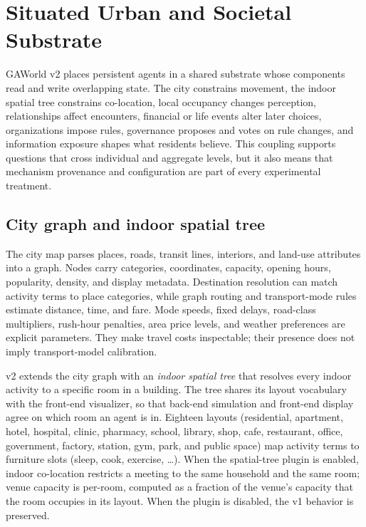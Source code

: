 \section{Situated Urban and Societal Substrate}
\label{sec:substrate}

GAWorld v2 places persistent agents in a shared substrate whose components
read and write overlapping state.  The city constrains movement, the indoor
spatial tree constrains co-location, local occupancy changes perception,
relationships affect encounters, financial or life events alter later
choices, organizations impose rules, governance proposes and votes on rule
changes, and information exposure shapes what residents believe.  This
coupling supports questions that cross individual and aggregate levels, but
it also means that mechanism provenance and configuration are part of every
experimental treatment.

\subsection{City graph and indoor spatial tree}

The city map parses places, roads, transit lines, interiors, and land-use
attributes into a graph.  Nodes carry categories, coordinates, capacity,
opening hours, popularity, density, and display metadata.  Destination
resolution can match activity terms to place categories, while graph routing
and transport-mode rules estimate distance, time, and fare.  Mode speeds,
fixed delays, road-class multipliers, rush-hour penalties, area price levels,
and weather preferences are explicit parameters.  They make travel costs
inspectable; their presence does not imply transport-model calibration.

v2 extends the city graph with an \emph{indoor spatial tree} that resolves
every indoor activity to a specific room in a building.  The tree shares its
layout vocabulary with the front-end visualizer, so that back-end simulation
and front-end display agree on which room an agent is in.  Eighteen layouts
(residential, apartment, hotel, hospital, clinic, pharmacy, school, library,
shop, cafe, restaurant, office, government, factory, station, gym, park, and
public space) map activity terms to furniture slots (sleep, cook, exercise,
\ldots).  When the spatial-tree plugin is enabled, indoor co-location
restricts a meeting to the same household and the same room; venue capacity
is per-room, computed as a fraction of the venue's capacity that the room
occupies in its layout.  When the plugin is disabled, the v1 behavior is
preserved.

